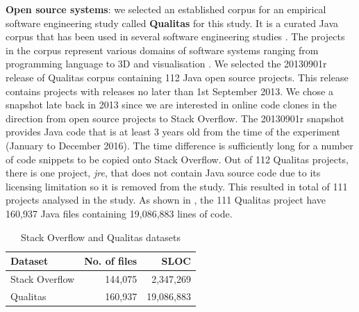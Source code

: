 \documentclass{sig-alternate-05-2015}
\begin{document}
\textbf{Open source systems}: we selected an established corpus for an empirical software engineering study called \textbf{Qualitas} \cite{QualitasCorpus} for this study. It is a curated Java corpus that has been used in several software engineering studies \cite{Taube-Schock2011,Beckman2011,Vasilescu2011,Omar2012}. The projects in the corpus represent various domains of software systems ranging from programming language to 3D and visualisation \cite{QualitasCorpus}. We selected the 20130901r release of Qualitas corpus containing 112 Java open source projects. This release contains projects with releases no later than 1st September 2013. We chose a snapshot late back in 2013 since we are interested in online code clones in the direction from open source projects to Stack Overflow. The 20130901r snapshot provides Java code that is at least 3 years old from the time of the experiment (January to December 2016). The time difference is sufficiently long for a number of code snippets to be copied onto Stack Overflow. Out of 112 Qualitas projects, there is one project, \textit{jre}, that does not contain Java source code due to its licensing limitation \cite{QualitasCorpus} so it is removed from the study. This resulted in total of 111 projects analysed in the study. As shown in , the 111 Qualitas project have 160,937 Java files containing 19,086,883 lines of code. %

\begin{table}
	\centering
	\caption{Stack Overflow and Qualitas datasets}
	\label{tab:datasets}
	\small
	\begin{tabular}{l|r|r}
		\hline 
		Dataset & No. of files & SLOC \\
		\hline
		Stack Overflow & 144,075 & 2,347,269 \\ 
		\hline 
		Qualitas &  160,937 & 19,086,883 \\ 
		\hline 
	\end{tabular} 
\end{table}
\end{document}
